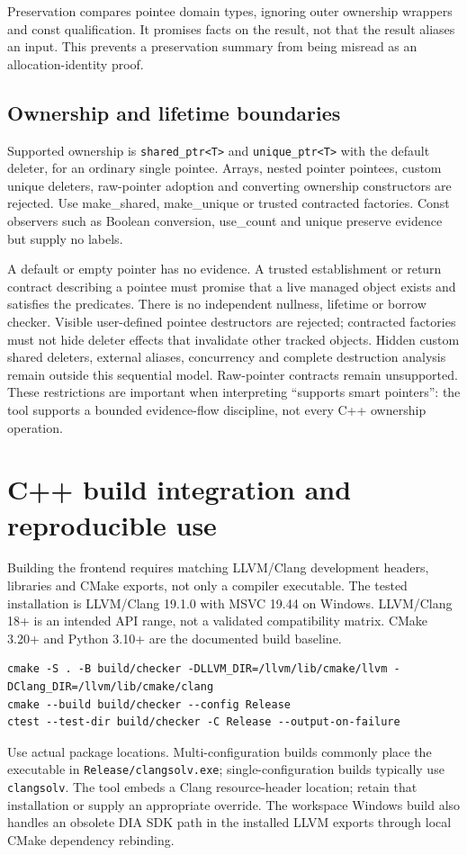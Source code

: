 \documentclass[11pt]{article}
\begin{document}
Preservation compares pointee domain types, ignoring outer ownership wrappers
and const qualification. It promises facts on the result, not that the result
aliases an input. This prevents a preservation summary from being misread as
an allocation-identity proof.

\subsection{Ownership and lifetime boundaries}
Supported ownership is \texttt{shared\_ptr<T>} and \texttt{unique\_ptr<T>}
with the default deleter, for an ordinary single pointee. Arrays, nested
pointer pointees, custom unique deleters, raw-pointer adoption and converting
ownership constructors are rejected. Use make\_shared, make\_unique or
trusted contracted factories. Const observers such as Boolean conversion,
use\_count and unique preserve evidence but supply no labels.

A default or empty pointer has no evidence. A trusted establishment or return
contract describing a pointee must promise that a live managed object exists
and satisfies the predicates. There is no independent nullness, lifetime or
borrow checker. Visible user-defined pointee destructors are rejected;
contracted factories must not hide deleter effects that invalidate other
tracked objects. Hidden custom shared deleters, external aliases, concurrency
and complete destruction analysis remain outside this sequential model.
Raw-pointer contracts remain unsupported. These restrictions are important
when interpreting ``supports smart pointers'': the tool supports a bounded
evidence-flow discipline, not every C++ ownership operation.

\section{C++ build integration and reproducible use}
Building the frontend requires matching LLVM/Clang development headers,
libraries and CMake exports, not only a compiler executable. The tested
installation is LLVM/Clang 19.1.0 with MSVC 19.44 on Windows. LLVM/Clang 18+
is an intended API range, not a validated compatibility matrix. CMake 3.20+
and Python 3.10+ are the documented build baseline.

\begin{lstlisting}
cmake -S . -B build/checker -DLLVM_DIR=/llvm/lib/cmake/llvm -DClang_DIR=/llvm/lib/cmake/clang
cmake --build build/checker --config Release
ctest --test-dir build/checker -C Release --output-on-failure
\end{lstlisting}
Use actual package locations. Multi-configuration builds commonly place the
executable in \texttt{Release/clangsolv.exe}; single-configuration builds
typically use \texttt{clangsolv}. The tool embeds a Clang resource-header
location; retain that installation or supply an appropriate override.
The workspace Windows build also handles an obsolete DIA SDK path in the
installed LLVM exports through local CMake dependency rebinding.
\end{document}
